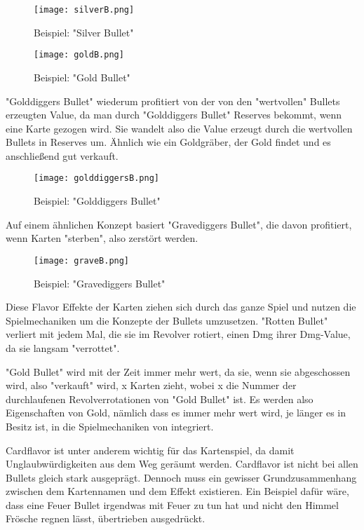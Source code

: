 \begin{figure}[H]
    \texttt{[image: silverB.png]}
    \caption{Beispiel: "Silver Bullet"}
\end{figure}

    \begin{figure}[H]
    \texttt{[image: goldB.png]}
    \caption{Beispiel: "Gold Bullet"}
\end{figure}



"Golddiggers Bullet" wiederum profitiert von der von den "wertvollen" Bullets erzeugten Value, da man durch "Golddiggers Bullet" Reserves bekommt,
wenn eine Karte gezogen wird. Sie wandelt also die Value erzeugt durch die wertvollen Bullets in Reserves um.
Ähnlich wie ein Goldgräber, der Gold findet und es anschließend gut verkauft.

\begin{figure}[H]
    \texttt{[image: golddiggersB.png]}
    \caption{Beispiel: "Golddiggers Bullet"}
\end{figure}

Auf einem ähnlichen Konzept basiert "Gravediggers Bullet", die davon profitiert, wenn Karten "sterben", also zerstört werden.


\begin{figure}[H]
    \texttt{[image: graveB.png]}
    \caption{Beispiel: "Gravediggers Bullet"}
\end{figure}


Diese Flavor Effekte der Karten ziehen sich durch das ganze Spiel und nutzen die Spielmechaniken um die Konzepte der Bullets umzusetzen.
"Rotten Bullet" \zB verliert mit jedem Mal, die sie im Revolver rotiert, einen Dmg ihrer Dmg-Value, da sie langsam "verrottet".


"Gold Bullet" wird mit der Zeit immer mehr wert, da sie, wenn sie abgeschossen wird, also "verkauft" wird, x Karten zieht,
wobei x die Nummer der durchlaufenen Revolverrotationen von "Gold Bullet" ist. Es werden also Eigenschaften von Gold,
nämlich dass es immer mehr wert wird, je länger es in Besitz ist, in die Spielmechaniken von \FF integriert.


Cardflavor ist unter anderem wichtig für das Kartenspiel, da damit Unglaubwürdigkeiten aus dem Weg geräumt werden.
Cardflavor ist nicht bei allen Bullets gleich stark ausgeprägt. Dennoch muss ein gewisser Grundzusammenhang zwischen dem
Kartennamen und dem Effekt existieren. Ein Beispiel dafür wäre, dass eine Feuer Bullet irgendwas mit Feuer zu tun hat und
nicht den Himmel Frösche regnen lässt, übertrieben ausgedrückt.


